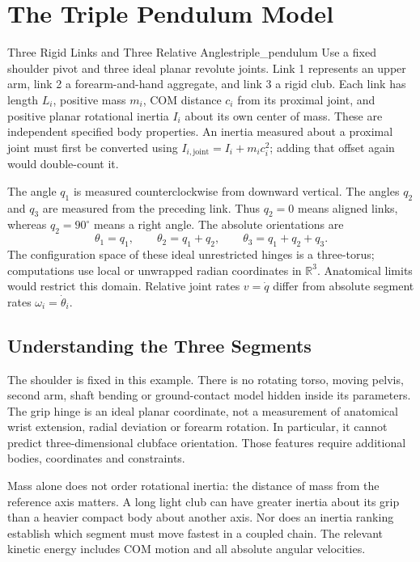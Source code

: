 \section{The Triple Pendulum Model}
\label{sec:triple_pendulum_setup}
\begin{definition}{Three Rigid Links and Three Relative Angles}{triple_pendulum}
Use a fixed shoulder pivot and three ideal planar revolute joints. Link 1 represents an upper arm, link 2 a forearm-and-hand aggregate, and link 3 a rigid club. Each link has length $L_i$, positive mass $m_i$, COM distance $c_i$ from its proximal joint, and positive planar rotational inertia $I_i$ about its own center of mass. These are independent specified body properties. An inertia measured about a proximal joint must first be converted using $I_{i,\mathrm{joint}}=I_i+m_i c_i^2$; adding that offset again would double-count it.

The angle $q_1$ is measured counterclockwise from downward vertical. The angles $q_2$ and $q_3$ are measured from the preceding link. Thus $q_2=0$ means aligned links, whereas $q_2=90^\circ$ means a right angle. The absolute orientations are
\[
\theta_1=q_1,\qquad \theta_2=q_1+q_2,\qquad
\theta_3=q_1+q_2+q_3.
\]
The configuration space of these ideal unrestricted hinges is a three-torus; computations use local or unwrapped radian coordinates in $\mathbb R^3$. Anatomical limits would restrict this domain. Relative joint rates $v=\dot q$ differ from absolute segment rates $\omega_i=\dot\theta_i$.
\end{definition}

\subsection{Understanding the Three Segments}
\label{inplain:triple_pendulum_segments}
\label{laymans:inplain:triple_pendulum_segments}
The shoulder is fixed in this example. There is no rotating torso, moving pelvis, second arm, shaft bending or ground-contact model hidden inside its parameters. The grip hinge is an ideal planar coordinate, not a measurement of anatomical wrist extension, radial deviation or forearm rotation. In particular, it cannot predict three-dimensional clubface orientation. Those features require additional bodies, coordinates and constraints.

Mass alone does not order rotational inertia: the distance of mass from the reference axis matters. A long light club can have greater inertia about its grip than a heavier compact body about another axis. Nor does an inertia ranking establish which segment must move fastest in a coupled chain. The relevant kinetic energy includes COM motion and all absolute angular velocities.

